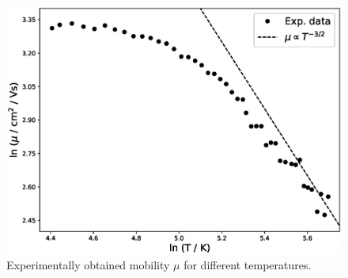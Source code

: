 \documentclass[11pt,a4paper]{article}
\begin{document}
\begin{figure}[H]
\centering
\includegraphics[width=.8\textwidth]{Hall_mobility.eps}
\caption{Experimentally obtained mobility $\mu$ for different temperatures.}
\label{fig:hall_mobility}
\end{figure}


\nocite{*}
\vfill


\end{document}
